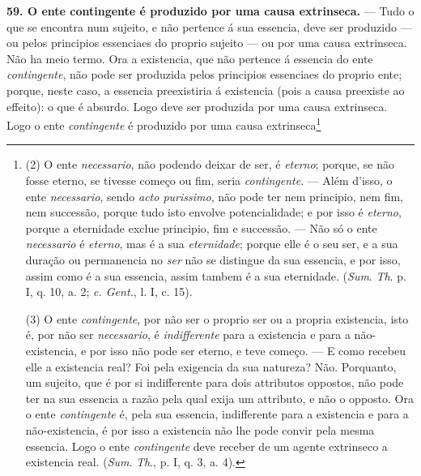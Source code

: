 \textbf{59. O ente contingente é produzido por uma causa extrinseca.} — Tudo o que se encontra num sujeito, e não pertence á sua essencia, deve ser produzido — ou pelos principios essenciaes do proprio sujeito — ou por uma causa extrinseca. Não ha meio termo. Ora a existencia, que não pertence á essencia do ente \emph{contingente}, não pode ser produzida pelos principios essenciaes do proprio ente; porque, neste caso, a essencia preexistiria á existencia (pois a causa preexiste ao effeito): o que é absurdo. Logo deve ser produzida por uma causa extrinseca. Logo o ente \emph{contingente} é produzido por uma causa extrinseca\footnote{(2) O ente \emph{necessario}, não podendo deixar de ser, é \emph{eterno}; porque, se não fosse eterno, se tivesse começo ou fim, seria \emph{contingente}. — Além d'isso, o ente \emph{necessario}, sendo \emph{acto purissimo}, não pode ter nem principio, nem fim, nem successão, porque tudo isto envolve potencialidade; e por isso é \emph{eterno}, porque a eternidade exclue principio, fim e successão. — Não só o ente \emph{necessario} é \emph{eterno}, mas é a sua \emph{eternidade}; porque elle é o seu ser, e a sua duração ou permanencia no \emph{ser} não se distingue da sua essencia, e por isso, assim como é a sua essencia, assim tambem é a sua eternidade. (\emph{Sum}. \emph{Th}. p. I, q. 10, a. 2; \emph{c. Gent.}, l. I, c. 15).\par (3) O ente \emph{contingente}, por não ser o proprio ser ou a propria existencia, isto é, por não ser \emph{necessario}, é \emph{indifferente} para a existencia e para a não-existencia, e por isso não pode ser eterno, e teve começo. — E como recebeu elle a existencia real? Foi pela exigencia da sua natureza? Não. Porquanto, um sujeito, que é por si indifferente para dois attributos oppostos, não pode ter na sua essencia a razão pela qual exija um attributo, e não o opposto. Ora o ente \emph{contingente} é, pela sua essencia, indifferente para a existencia e para a não-existencia, é por isso a existencia não lhe pode convir pela mesma essencia. Logo o ente \emph{contingente} deve receber de um agente extrinseco a existencia real. (\emph{Sum}. \emph{Th}., p. I, q. 3, a. 4).}

